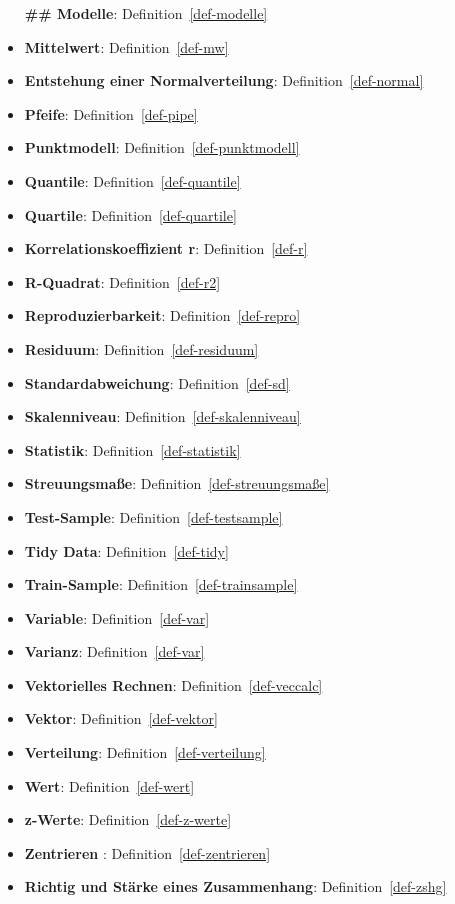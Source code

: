 \documentclass[
  a4paper,
]{scrbook}
\theoremstyle{definition}
\theoremstyle{definition}
\theoremstyle{definition}
\theoremstyle{remark}
\begin{document}
\begin{itemize}
  \textbf{\#\# Modelle}: Definition~\ref{def-modelle}
\item
  \textbf{Mittelwert}: Definition~\ref{def-mw}
\item
  \textbf{Entstehung einer Normalverteilung}:
  Definition~\ref{def-normal}
\item
  \textbf{Pfeife}: Definition~\ref{def-pipe}
\item
  \textbf{Punktmodell}: Definition~\ref{def-punktmodell}
\item
  \textbf{Quantile}: Definition~\ref{def-quantile}
\item
  \textbf{Quartile}: Definition~\ref{def-quartile}
\item
  \textbf{Korrelationskoeffizient r}: Definition~\ref{def-r}
\item
  \textbf{R-Quadrat}: Definition~\ref{def-r2}
\item
  \textbf{Reproduzierbarkeit}: Definition~\ref{def-repro}
\item
  \textbf{Residuum}: Definition~\ref{def-residuum}
\item
  \textbf{Standardabweichung}: Definition~\ref{def-sd}
\item
  \textbf{Skalenniveau}: Definition~\ref{def-skalenniveau}
\item
  \textbf{Statistik}: Definition~\ref{def-statistik}
\item
  \textbf{Streuungsmaße}: Definition~\ref{def-streuungsmaße}
\item
  \textbf{Test-Sample}: Definition~\ref{def-testsample}
\item
  \textbf{Tidy Data}: Definition~\ref{def-tidy}
\item
  \textbf{Train-Sample}: Definition~\ref{def-trainsample}
\item
  \textbf{Variable}: Definition~\ref{def-var}
\item
  \textbf{Varianz}: Definition~\ref{def-var}
\item
  \textbf{Vektorielles Rechnen}: Definition~\ref{def-veccalc}
\item
  \textbf{Vektor}: Definition~\ref{def-vektor}
\item
  \textbf{Verteilung}: Definition~\ref{def-verteilung}
\item
  \textbf{Wert}: Definition~\ref{def-wert}
\item
  \textbf{z-Werte}: Definition~\ref{def-z-werte}
\item
  \textbf{Zentrieren }: Definition~\ref{def-zentrieren}
\item
  \textbf{Richtig und Stärke eines Zusammenhang}:
  Definition~\ref{def-zshg}
\end{itemize}


\backmatter
\end{document}
